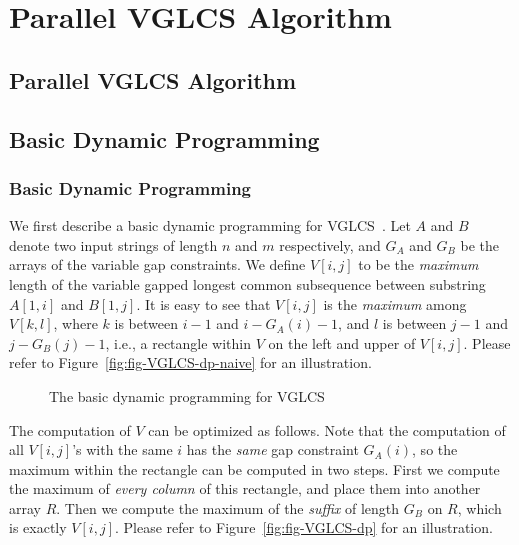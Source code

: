 \ifdefined\MasterThesis
\chapter{Parallel VGLCS Algorithm}
\else
\section{Parallel VGLCS Algorithm}
\fi
\label{sec:parallelVGLCS}


\ifdefined\MasterThesis
\section{Basic Dynamic Programming}
\else
\subsection{Basic Dynamic Programming}
\fi

We first describe a basic dynamic programming for
VGLCS~\cite{Peng2011TheLC}. Let $A$ and $B$ denote two input strings of
length $n$ and $m$ respectively, and $G_A$ and $G_B$ be the arrays of
the variable gap constraints.  We define $V[i, j]$ to be the {\em
maximum} length of the variable gapped longest common subsequence
between substring $A[1, i]$ and $B[1, j]$.  It is easy to see that $V[i,
j]$ is the {\em maximum} among $V[k, l]$, where $k$ is between $i -1$
and $i-G_A(i)-1$, and $l$ is between $j -1 $ and $j-G_B(j)-1$, i.e., a
rectangle within $V$ on the left and upper of $V[i,j]$.  Please refer to
Figure~\ref{fig:fig-VGLCS-dp-naive} for an illustration.

\begin{figure}[!thb]
  \centering {} 
  \caption{The basic dynamic programming for VGLCS}
  \label{fig:basic-dp-VGLCS}
\end{figure}

The computation of $V$ can be optimized as follows.  Note that the
computation of all $V[i, j]$'s with the same $i$ has the {\em same}
gap constraint $G_A(i)$, so the maximum within the rectangle can be
computed in two steps.  First we compute the maximum of {\em every
  column} of this rectangle, and place them into another array $R$.
Then we compute the maximum of the {\em suffix} of length $G_B$ on
$R$, which is exactly $V[i, j]$.  Please refer to
Figure~\ref{fig:fig-VGLCS-dp} for an illustration.

